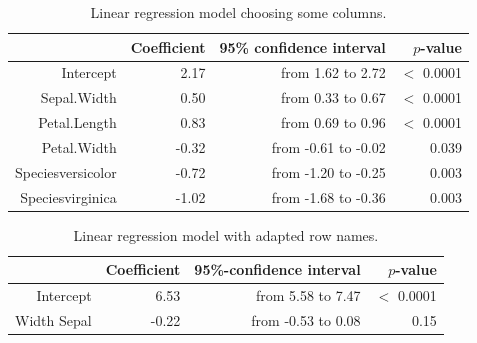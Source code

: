 \documentclass[11pt,a4paper,twoside]{article}\usepackage[]{graphicx}\usepackage[]{color}
\begin{document}
\begin{table}[!h]
\centering
{\footnotesize
\begin{tabular}{rrrr}
  \hline
 & Coefficient & 95\% confidence interval & $p$-value \\ 
  \hline
Intercept & 2.17 & from 1.62 to 2.72 & $<$ 0.0001 \\ 
  Sepal.Width & 0.50 & from 0.33 to 0.67 & $<$ 0.0001 \\ 
  Petal.Length & 0.83 & from 0.69 to 0.96 & $<$ 0.0001 \\ 
  Petal.Width & -0.32 & from -0.61 to -0.02 & 0.039 \\ 
  Speciesversicolor & -0.72 & from -1.20 to -0.25 & 0.003 \\ 
  Speciesvirginica & -1.02 & from -1.68 to -0.36 & 0.003 \\ 
   \hline
\end{tabular}
}
\caption{Linear regression model choosing some columns.} 
\label{tab:regmod1}
\end{table}
\begin{table}[!h]
\centering
{\footnotesize
\begin{tabular}{rrrr}
  \hline
 & Coefficient & 95\%-confidence interval & $p$-value \\ 
  \hline
Intercept & 6.53 & from 5.58 to 7.47 & $<$ 0.0001 \\ 
  Width Sepal & -0.22 & from -0.53 to 0.08 & 0.15 \\ 
   \hline
\end{tabular}
}
\caption{Linear regression model with adapted row names.} 
\label{tab:regmod2}
\end{table}
\end{document}
